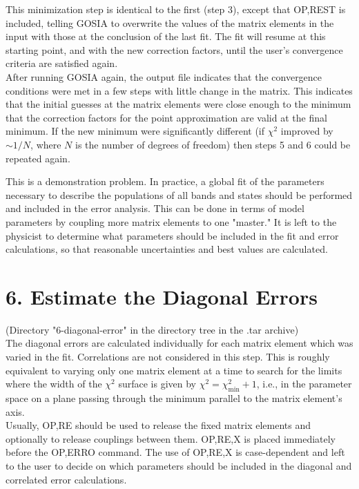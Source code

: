\documentclass[10pt]{article}
\begin{document}
This minimization step is identical to the first (step 3), except that OP,REST is included, telling GOSIA to overwrite the values of the matrix elements in the input with those at the conclusion of the last fit. The fit will resume at this starting point, and with the new correction factors, until the user's convergence criteria are satisfied again.\\
After running GOSIA again, the output file indicates that the convergence conditions were met in a few steps with little change in the matrix. This indicates that the initial guesses at the matrix elements were close enough to the minimum that the correction factors for the point approximation are valid at the final minimum. If the new minimum were significantly different (if $\chi^{2}$ improved by $\sim 1 / N$, where $N$ is the number of degrees of freedom) then steps 5 and 6 could be repeated again.

This is a demonstration problem. In practice, a global fit of the parameters necessary to describe the populations of all bands and states should be performed and included in the error analysis. This can be done in terms of model parameters by coupling more matrix elements to one "master." It is left to the physicist to determine what parameters should be included in the fit and error calculations, so that reasonable uncertainties and best values are calculated.

\section*{6. Estimate the Diagonal Errors}
(Directory "6-diagonal-error" in the directory tree in the .tar archive)\\
The diagonal errors are calculated individually for each matrix element which was varied in the fit. Correlations are not considered in this step. This is roughly equivalent to varying only one matrix element at a time to search for the limits where the width of the $\chi^{2}$ surface is given by $\chi^{2}=\chi_{\min }^{2}+1$, i.e., in the parameter space on a plane passing through the minimum parallel to the matrix element's axis.\\
Usually, OP,RE should be used to release the fixed matrix elements and optionally to release couplings between them. OP,RE,X is placed immediately before the OP,ERRO command. The use of OP,RE,X is case-dependent and left to the user to decide on which parameters should be included in the diagonal and correlated error calculations.
\end{document}
